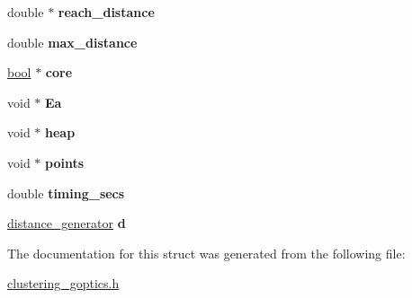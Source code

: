 \begin{DoxyCompactItemize}
\item 
\mbox{\label{structgoptics__cluster__struct_a49a668329b0f258244aec560dee713a5}} 
double $\ast$ {\bfseries reach\+\_\+distance}
\item 
\mbox{\label{structgoptics__cluster__struct_afb23461667cc643aa9609f50d5f7c95c}} 
double {\bfseries max\+\_\+distance}
\item 
\mbox{\label{structgoptics__cluster__struct_aed579d02083c6af4f9d87d1d5d3eac61}} 
\hyperlink{lowlevel_8h_a97a80ca1602ebf2303258971a2c938e2}{bool} $\ast$ {\bfseries core}
\item 
\mbox{\label{structgoptics__cluster__struct_a0a4fe7cba7d345305635721c57091425}} 
void $\ast$ {\bfseries Ea}
\item 
\mbox{\label{structgoptics__cluster__struct_a1efe741cee0d65d9c2faea8be1fccdff}} 
void $\ast$ {\bfseries heap}
\item 
\mbox{\label{structgoptics__cluster__struct_a9c0395bfbb20960478d873df23e179f4}} 
void $\ast$ {\bfseries points}
\item 
\mbox{\label{structgoptics__cluster__struct_ade33930b1c6e266735b8413a7c98bc9d}} 
double {\bfseries timing\+\_\+secs}
\item 
\mbox{\label{structgoptics__cluster__struct_a6bd1c762f8424341fd97867fe95de77f}} 
\hyperlink{structdistance__generator__struct}{distance\+\_\+generator} {\bfseries d}
\end{DoxyCompactItemize}


The documentation for this struct was generated from the following file\+:\begin{DoxyCompactItemize}
\item 
\hyperlink{clustering__goptics_8h}{clustering\+\_\+goptics.\+h}\end{DoxyCompactItemize}

